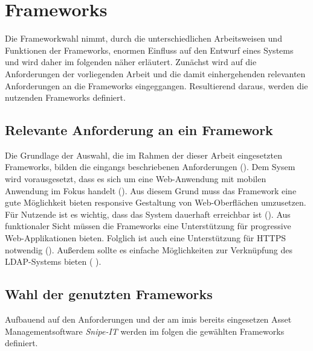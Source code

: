\section{Frameworks}
\label{section:frameworks}
Die Frameworkwahl nimmt, durch die unterschiedlichen Arbeitsweisen und Funktionen
der Frameworks, enormen Einfluss auf den Entwurf eines Systems und wird daher im
folgenden näher erläutert. Zunächst wird auf die Anforderungen der vorliegenden
Arbeit und die damit einhergehenden relevanten Anforderungen an die Frameworks
eingeggangen. Resultierend daraus, werden die nutzenden Frameworks definiert.

\subsection{Relevante Anforderung an ein Framework}
Die Grundlage der Auswahl, die im Rahmen der dieser Arbeit eingesetzten
Frameworks, bilden die eingangs beschriebenen Anforderungen
(). Dem Sysem wird vorausgesetzt, dass es sich um
eine Web-Anwendung mit mobilen Anwendung im Fokus handelt
(). Aus diesem Grund muss das Framework eine gute
Möglichkeit bieten responsive Gestaltung von Web-Oberflächen umzusetzen. Für
Nutzende ist es wichtig, dass das System dauerhaft erreichbar ist
(). Aus funktionaler Sicht müssen die Frameworks eine Unterstützung
für progressive Web-Applikationen bieten. Folglich ist auch eine Unterstützung
für HTTPS notwendig (). Außerdem sollte es einfache Möglichkeiten
zur Verknüpfung des LDAP-Systems bieten ( ).

\subsection{Wahl der genutzten Frameworks}
Aufbauend auf den Anforderungen und der am \ac{imis} bereits eingesetzen Asset
Managementsoftware \textit{Snipe-IT} werden im folgen die gewählten Frameworks definiert.

